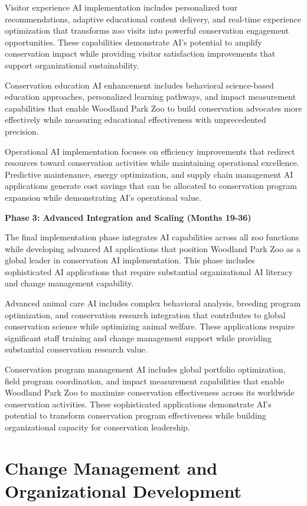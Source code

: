 \documentclass[
  Letterpaper,
]{scrbook}
\begin{document}
Visitor experience AI implementation includes personalized tour
recommendations, adaptive educational content delivery, and real-time
experience optimization that transforms zoo visits into powerful
conservation engagement opportunities. These capabilities demonstrate
AI's potential to amplify conservation impact while providing visitor
satisfaction improvements that support organizational sustainability.

Conservation education AI enhancement includes behavioral science-based
education approaches, personalized learning pathways, and impact
measurement capabilities that enable Woodland Park Zoo to build
conservation advocates more effectively while measuring educational
effectiveness with unprecedented precision.

Operational AI implementation focuses on efficiency improvements that
redirect resources toward conservation activities while maintaining
operational excellence. Predictive maintenance, energy optimization, and
supply chain management AI applications generate cost savings that can
be allocated to conservation program expansion while demonstrating AI's
operational value.

\textbf{Phase 3: Advanced Integration and Scaling (Months 19-36)}

The final implementation phase integrates AI capabilities across all zoo
functions while developing advanced AI applications that position
Woodland Park Zoo as a global leader in conservation AI implementation.
This phase includes sophisticated AI applications that require
substantial organizational AI literacy and change management capability.

Advanced animal care AI includes complex behavioral analysis, breeding
program optimization, and conservation research integration that
contributes to global conservation science while optimizing animal
welfare. These applications require significant staff training and
change management support while providing substantial conservation
research value.

Conservation program management AI includes global portfolio
optimization, field program coordination, and impact measurement
capabilities that enable Woodland Park Zoo to maximize conservation
effectiveness across its worldwide conservation activities. These
sophisticated applications demonstrate AI's potential to transform
conservation program effectiveness while building organizational
capacity for conservation leadership.

\section{Change Management and Organizational
Development}\label{change-management-and-organizational-development}
\end{document}
